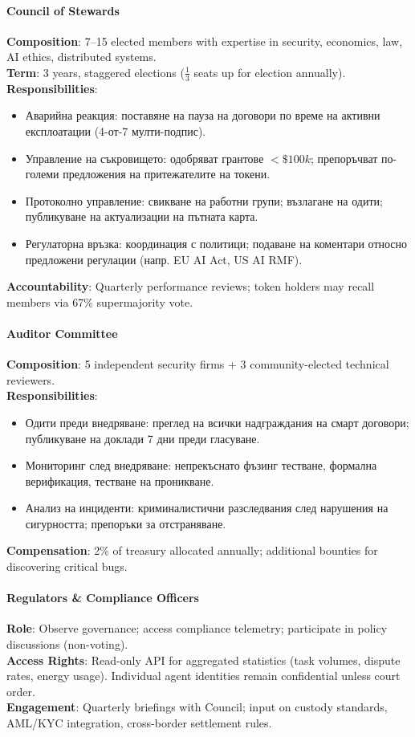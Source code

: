 \documentclass[11pt]{article}
\begin{document}
\paragraph{Council of Stewards}
\textbf{Composition}: 7--15 elected members with expertise in security, economics, law, AI ethics, distributed systems.\\
\textbf{Term}: 3 years, staggered elections ($\frac{1}{3}$ seats up for election annually).\\
\textbf{Responsibilities}:
\begin{itemize}[noitemsep]
  \item Аварийна реакция: поставяне на пауза на договори по време на активни експлоатации (4-от-7 мулти-подпис).
  \item Управление на съкровището: одобряват грантове $<\$100k$; препоръчват по-големи предложения на притежателите на токени.
  \item Протоколно управление: свикване на работни групи; възлагане на одити; публикуване на актуализации на пътната карта.
  \item Регулаторна връзка: координация с политици; подаване на коментари относно предложени регулации (напр. EU AI Act, US AI RMF).
\end{itemize}
\textbf{Accountability}: Quarterly performance reviews; token holders may recall members via 67\% supermajority vote.

\paragraph{Auditor Committee}
\textbf{Composition}: 5 independent security firms + 3 community-elected technical reviewers.\\
\textbf{Responsibilities}:
\begin{itemize}[noitemsep]
  \item Одити преди внедряване: преглед на всички надграждания на смарт договори; публикуване на доклади 7 дни преди гласуване.
  \item Мониторинг след внедряване: непрекъснато фъзинг тестване, формална верификация, тестване на проникване.
  \item Анализ на инциденти: криминалистични разследвания след нарушения на сигурността; препоръки за отстраняване.
\end{itemize}
\textbf{Compensation}: 2\% of treasury allocated annually; additional bounties for discovering critical bugs.

\paragraph{Regulators \& Compliance Officers}
\textbf{Role}: Observe governance; access compliance telemetry; participate in policy discussions (non-voting).\\
\textbf{Access Rights}: Read-only API for aggregated statistics (task volumes, dispute rates, energy usage). Individual agent identities remain confidential unless court order.\\
\textbf{Engagement}: Quarterly briefings with Council; input on custody standards, AML/KYC integration, cross-border settlement rules.
\end{document}
